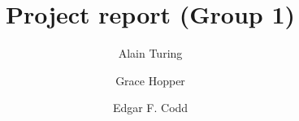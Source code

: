 \title{Project report (Group 1)} %
\author{Alain Turing \and Grace Hopper \and Edgar F. Codd} %

\institute{\lectureInstitute} %
\begin{report}










\end{report}

